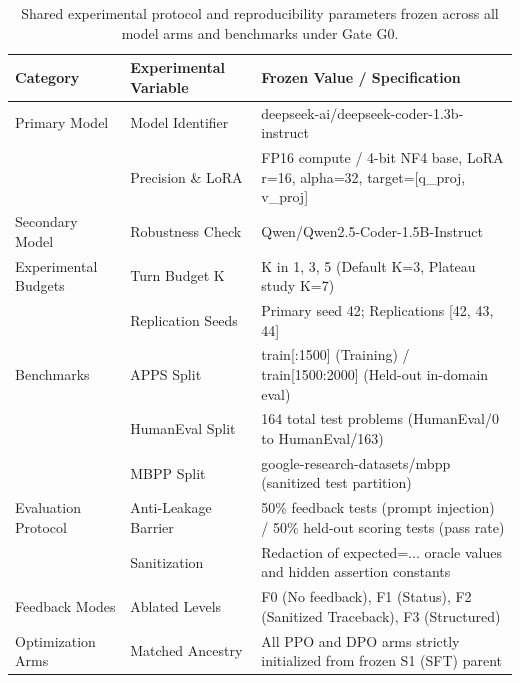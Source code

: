 \begin{table}[t]
\centering\small
\begin{tabular}{lll}
\toprule
\textbf{Category} & \textbf{Experimental Variable} & \textbf{Frozen Value / Specification} \\
\midrule
Primary Model & Model Identifier & deepseek-ai/deepseek-coder-1.3b-instruct \\
 & Precision \& LoRA & FP16 compute / 4-bit NF4 base, LoRA r=16, alpha=32, target=[q\_proj, v\_proj] \\
Secondary Model & Robustness Check & Qwen/Qwen2.5-Coder-1.5B-Instruct \\
Experimental Budgets & Turn Budget K & K in {1, 3, 5} (Default K=3, Plateau study K=7) \\
 & Replication Seeds & Primary seed 42; Replications [42, 43, 44] \\
Benchmarks & APPS Split & train[:1500] (Training) / train[1500:2000] (Held-out in-domain eval) \\
 & HumanEval Split & 164 total test problems (HumanEval/0 to HumanEval/163) \\
 & MBPP Split & google-research-datasets/mbpp (sanitized test partition) \\
Evaluation Protocol & Anti-Leakage Barrier & 50\% feedback tests (prompt injection) / 50\% held-out scoring tests (pass rate) \\
 & Sanitization & Redaction of expected=... oracle values and hidden assertion constants \\
Feedback Modes & Ablated Levels & F0 (No feedback), F1 (Status), F2 (Sanitized Traceback), F3 (Structured) \\
Optimization Arms & Matched Ancestry & All PPO and DPO arms strictly initialized from frozen S1 (SFT) parent \\
\bottomrule
\end{tabular}
\caption{Shared experimental protocol and reproducibility parameters frozen across all model arms and benchmarks under Gate G0.}
\label{tab:protocol_contract}
\end{table}
